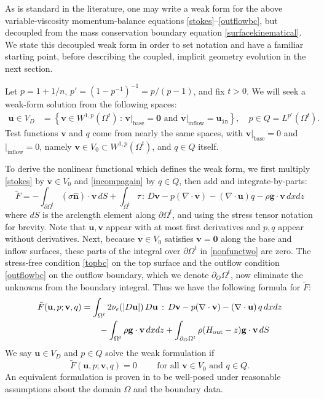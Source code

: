\documentclass[letterpaper,final,12pt,reqno]{amsart}
\newcommand{\eps}{\epsilon}
\newcommand{\hbn}{\hat{\mathbf{n}}}
\newcommand{\bg}{\mathbf{g}}
\newcommand{\bu}{\mathbf{u}}
\newcommand{\bv}{\mathbf{v}}
\newcommand{\bzero}{\bm{0}}
\begin{document}
As is standard in the literature, one may write a weak form for the above variable-viscosity momentum-balance equations \eqref{stokes}--\eqref{outflowbc}, but decoupled from the mass conservation boundary equation \eqref{surfacekinematical}.  We state this decoupled weak form in order to set notation and have a familiar starting point, before describing the coupled, implicit geometry evolution in the next section.

Let $p=1+1/n$, $p'=(1-p^{-1})^{-1}=p/(p-1)$, and fix $t>0$.  We will seek a weak-form solution from the following spaces:
\begin{align*}
\bu \in V_D &= \left\{\bv \in W^{1,p}(\Omega^t)\,:\,\bv\big|_{\text{base}}=\bzero \text{ and } \bv\big|_{\text{inflow}} = \bu_{\texttt{in}}\right\}, \quad p \in Q =L^{p'}(\Omega^t).
\end{align*}
Test functions $\bv$ and $q$ come from nearly the same spaces, with $\bv\big|_{\text{base}} =0$ and $\big|_{\text{inflow}} = 0$, namely $\bv \in V_0 \subset W^{1,p}(\Omega^t)$, and $q \in Q$ itself.

To derive the nonlinear functional which defines the weak form, we first multiply \eqref{stokes} by $\bv\in V_0$ and \eqref{incompagain} by $q\in Q$, then add and integrate-by-parts:
\begin{equation}
\tilde F = -\int_{\partial\Omega^t} (\sigma \hbn)\cdot \bv\,dS + \int_{\Omega^t} \tau \,:\,D\bv - p (\nabla \cdot \bv) - \left(\nabla \cdot \bu\right) q - \rho \mathbf{g} \cdot \bv \,dx dz \label{nonfunctwo}
\end{equation}
where $dS$ is the arclength element along $\partial\Omega^t$, and using the stress tensor notation for brevity.  Note that $\bu,\bv$ appear with at most first derivatives and $p,q$ appear without derivatives.  Next, because $\bv\in V_0$ satisfies $\bv=\bzero$ along the base and inflow surfaces, these parts of the integral over $\partial\Omega^t$ in \eqref{nonfunctwo} are zero.  The stress-free condition \eqref{topbc} on the top surface and the outflow condition \eqref{outflowbc} on the outflow boundary, which we denote $\partial_O \Omega^t$, now eliminate the unknowns from the boundary integral.  Thus we have the following formula for $\tilde F$:
\begin{align}
\tilde F(\bu,p;\bv,q) &= \int_{\Omega^t} 2 \nu_\eps(|D\bu|)\, D\bu\,:\,D\bv - p (\nabla \cdot \bv) - \left(\nabla \cdot \bu\right) q \,dx dz \label{definetildeF} \\
    &\qquad  - \int_{\Omega^t} \rho \mathbf{g} \cdot \bv \,dx dz + \int_{\partial_O \Omega^t} \rho (H_{\text{out}}-z) \bg \cdot \bv \,dS \notag
\end{align}
We say $\bu\in V_D$ and $p\in Q$ solve the weak formulation if
\begin{equation}
\tilde F(\bu,p;\bv,q) = 0 \qquad \text{ for all } \bv\in V_0 \text{ and } q\in Q.  \label{weak}
\end{equation}
An equivalent formulation is proven in \cite[Theorem 3.8]{JouvetRappaz2011} to be well-posed under reasonable assumptions about the domain $\Omega$ and the boundary data.
\end{document}
